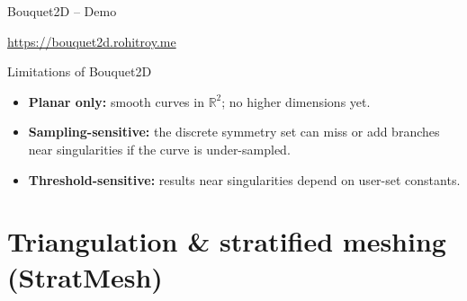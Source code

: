 \documentclass[
	11pt,
	aspectratio=169, %
]{beamer}
\newcommand{\R}{\mathbb{R}}
\begin{document}
\begin{frame}{Bouquet2D -- Demo}
    \begin{center}
        {\url{https://bouquet2d.rohitroy.me}}
    \end{center}
\end{frame}

\begin{frame}{Limitations of Bouquet2D}
    \begin{itemize}
        \item \textbf{Planar only:} smooth curves in $\R^2$; no higher dimensions yet.
        \item \textbf{Sampling-sensitive:} the discrete symmetry set can miss or add branches near singularities if the curve is under-sampled.
        \item \textbf{Threshold-sensitive:} results near singularities depend on user-set constants.
    \end{itemize}
\end{frame}

\section{Triangulation \& stratified meshing (StratMesh)}
\end{document}
